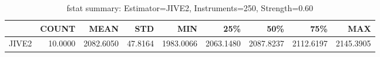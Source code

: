 \begin{table}[ht]
\centering
\caption{fstat summary: Estimator=JIVE2, Instruments=250, Strength=0.60}
\begin{tabular}{lrrrrrrrr}
\toprule
 & COUNT & MEAN & STD & MIN & 25\% & 50\% & 75\% & MAX \\
\midrule
JIVE2 & 10.0000 & 2082.6050 & 47.8164 & 1983.0066 & 2063.1480 & 2087.8237 & 2112.6197 & 2145.3905 \\
\bottomrule
\end{tabular}
\end{table}
